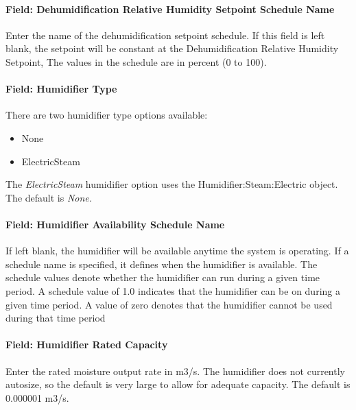 \paragraph{Field: Dehumidification Relative Humidity Setpoint Schedule Name}\label{field-dehumidification-relative-humidity-setpoint-schedule-name}

Enter the name of the dehumidification setpoint schedule. If this field is left blank, the setpoint will be constant at the Dehumidification Relative Humidity Setpoint, The values in the schedule are in percent (0 to 100).

\paragraph{Field: Humidifier Type}\label{field-humidifier-type-2}

There are two humidifier type options available:

\begin{itemize}
\item
  None
\item
  ElectricSteam
\end{itemize}

The \emph{ElectricSteam} humidifier option uses the Humidifier:Steam:Electric object. The default is \emph{None.}

\paragraph{Field: Humidifier Availability Schedule Name}\label{field-humidifier-availability-schedule-name-2}

If left blank, the humidifier will be available anytime the system is operating. If a schedule name is specified, it defines when the humidifier is available. The schedule values denote whether the humidifier can run during a given time period. A schedule value of 1.0 indicates that the humidifier can be on during a given time period. A value of zero denotes that the humidifier cannot be used during that time period

\paragraph{Field: Humidifier Rated Capacity}\label{field-humidifier-rated-capacity-2}

Enter the rated moisture output rate in m3/s. The humidifier does not currently autosize, so the default is very large to allow for adequate capacity. The default is 0.000001 m3/s.

